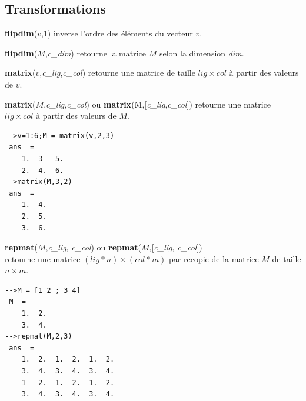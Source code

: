 \documentclass{article}
\begin{document}
\begin{multicols}{3}
\subsection{Transformations}
\begin{description}
\item{\textbf{flipdim}($v$,1)} inverse l'ordre des éléments du vecteur $v$.
\item{\textbf{flipdim}($M$,\textit{c\_dim})} retourne la matrice $M$ selon la dimension \textit{dim}.
\item{\textbf{matrix}($v$,\textit{c\_lig},\textit{c\_col})} retourne une matrice de taille $lig \times col$ à partir des valeurs de $v$.
\item{\textbf{matrix}($M$,\textit{c\_lig},\textit{c\_col}) ou \textbf{matrix}(M,[\textit{c\_lig},\textit{c\_col}])} retourne une matrice $lig \times col$ à partir des valeurs de $M$.
\begin{verbatim}
-->v=1:6;M = matrix(v,2,3)
 ans  =
    1.  3   5.  
    2.  4.  6. 
-->matrix(M,3,2)
 ans  =
    1.  4.  
    2.  5.  
    3.  6.
\end{verbatim}
\item{\textbf{repmat}($M$,\textit{c\_lig}, \textit{c\_col}) ou \textbf{repmat}($M$,[\textit{c\_lig}, \textit{c\_col}])}\\ retourne une matrice $(lig * n) \times (col * m)$  par recopie de la matrice $M$ de taille $n \times m$.
\begin{verbatim}
-->M = [1 2 ; 3 4]
 M  =
    1.  2.  
    3.  4.  
-->repmat(M,2,3)
 ans  =
    1.  2.  1.  2.  1.  2.  
    3.  4.  3.  4.  3.  4.  
    1   2.  1.  2.  1.  2.  
    3.  4.  3.  4.  3.  4.
\end{verbatim}
\end{description}

\end{multicols}
\end{document}
